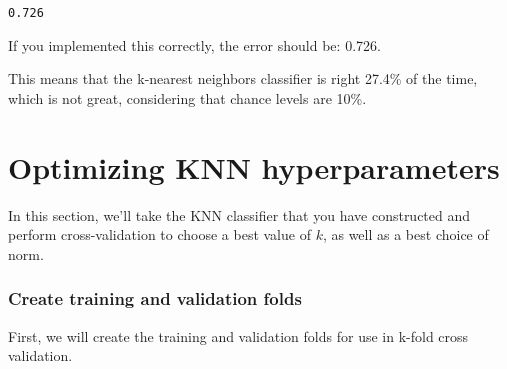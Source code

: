 \documentclass[11pt]{article}
\begin{document}
    \begin{Verbatim}[commandchars=\\\{\}]
0.726

    \end{Verbatim}

    If you implemented this correctly, the error should be: 0.726.

This means that the k-nearest neighbors classifier is right 27.4\% of
the time, which is not great, considering that chance levels are 10\%.

    \section{Optimizing KNN
hyperparameters}\label{optimizing-knn-hyperparameters}

In this section, we'll take the KNN classifier that you have constructed
and perform cross-validation to choose a best value of \(k\), as well as
a best choice of norm.

    \subsubsection{Create training and validation
folds}\label{create-training-and-validation-folds}

First, we will create the training and validation folds for use in
k-fold cross validation.
\end{document}
